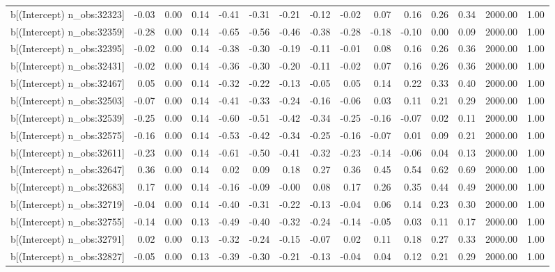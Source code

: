 \begin{table}[ht]
\begin{tabular}{rrrrrrrrrrrrrrr}
  b[(Intercept) n\_obs:32323] & -0.03 & 0.00 & 0.14 & -0.41 & -0.31 & -0.21 & -0.12 & -0.02 & 0.07 & 0.16 & 0.26 & 0.34 & 2000.00 & 1.00 \\ 
  b[(Intercept) n\_obs:32359] & -0.28 & 0.00 & 0.14 & -0.65 & -0.56 & -0.46 & -0.38 & -0.28 & -0.18 & -0.10 & 0.00 & 0.09 & 2000.00 & 1.00 \\ 
  b[(Intercept) n\_obs:32395] & -0.02 & 0.00 & 0.14 & -0.38 & -0.30 & -0.19 & -0.11 & -0.01 & 0.08 & 0.16 & 0.26 & 0.36 & 2000.00 & 1.00 \\ 
  b[(Intercept) n\_obs:32431] & -0.02 & 0.00 & 0.14 & -0.36 & -0.30 & -0.20 & -0.11 & -0.02 & 0.07 & 0.16 & 0.26 & 0.36 & 2000.00 & 1.00 \\ 
  b[(Intercept) n\_obs:32467] & 0.05 & 0.00 & 0.14 & -0.32 & -0.22 & -0.13 & -0.05 & 0.05 & 0.14 & 0.22 & 0.33 & 0.40 & 2000.00 & 1.00 \\ 
  b[(Intercept) n\_obs:32503] & -0.07 & 0.00 & 0.14 & -0.41 & -0.33 & -0.24 & -0.16 & -0.06 & 0.03 & 0.11 & 0.21 & 0.29 & 2000.00 & 1.00 \\ 
  b[(Intercept) n\_obs:32539] & -0.25 & 0.00 & 0.14 & -0.60 & -0.51 & -0.42 & -0.34 & -0.25 & -0.16 & -0.07 & 0.02 & 0.11 & 2000.00 & 1.00 \\ 
  b[(Intercept) n\_obs:32575] & -0.16 & 0.00 & 0.14 & -0.53 & -0.42 & -0.34 & -0.25 & -0.16 & -0.07 & 0.01 & 0.09 & 0.21 & 2000.00 & 1.00 \\ 
  b[(Intercept) n\_obs:32611] & -0.23 & 0.00 & 0.14 & -0.61 & -0.50 & -0.41 & -0.32 & -0.23 & -0.14 & -0.06 & 0.04 & 0.13 & 2000.00 & 1.00 \\ 
  b[(Intercept) n\_obs:32647] & 0.36 & 0.00 & 0.14 & 0.02 & 0.09 & 0.18 & 0.27 & 0.36 & 0.45 & 0.54 & 0.62 & 0.69 & 2000.00 & 1.00 \\ 
  b[(Intercept) n\_obs:32683] & 0.17 & 0.00 & 0.14 & -0.16 & -0.09 & -0.00 & 0.08 & 0.17 & 0.26 & 0.35 & 0.44 & 0.49 & 2000.00 & 1.00 \\ 
  b[(Intercept) n\_obs:32719] & -0.04 & 0.00 & 0.14 & -0.40 & -0.31 & -0.22 & -0.13 & -0.04 & 0.06 & 0.14 & 0.23 & 0.30 & 2000.00 & 1.00 \\ 
  b[(Intercept) n\_obs:32755] & -0.14 & 0.00 & 0.13 & -0.49 & -0.40 & -0.32 & -0.24 & -0.14 & -0.05 & 0.03 & 0.11 & 0.17 & 2000.00 & 1.00 \\ 
  b[(Intercept) n\_obs:32791] & 0.02 & 0.00 & 0.13 & -0.32 & -0.24 & -0.15 & -0.07 & 0.02 & 0.11 & 0.18 & 0.27 & 0.33 & 2000.00 & 1.00 \\ 
  b[(Intercept) n\_obs:32827] & -0.05 & 0.00 & 0.13 & -0.39 & -0.30 & -0.21 & -0.13 & -0.04 & 0.04 & 0.12 & 0.21 & 0.29 & 2000.00 & 1.00 \\ 

\end{tabular}
\end{table}
